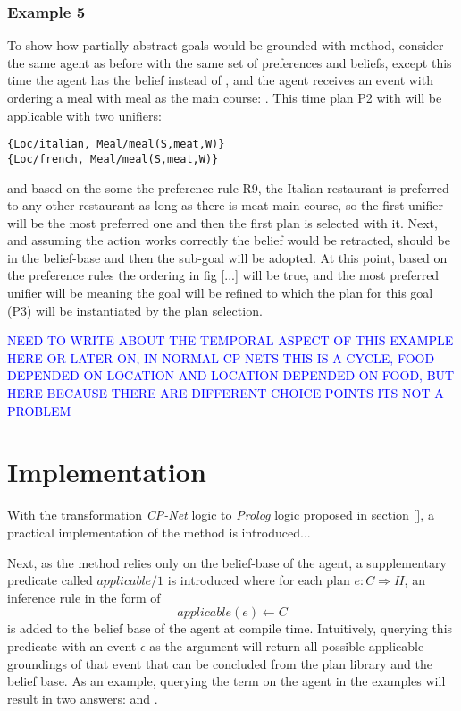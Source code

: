 \documentclass[sigconf,anonymous]{aamas}
\newcommand{\Mos}[1]{\textcolor{blue}{#1}}
\begin{document}
\subsubsection{Example 5}
To show how partially abstract goals would be grounded with method, consider the same agent as before with the same set of preferences and beliefs, except this time the agent has the belief  instead of , and the agent receives an event with ordering a meal with meal as the main course: . This time plan P2 with will be applicable with two unifiers:
\begin{verbatim}
{Loc/italian, Meal/meal(S,meat,W)}
{Loc/french, Meal/meal(S,meat,W)}
\end{verbatim}
and based on the some the preference rule R9, the Italian restaurant is preferred to any other restaurant as long as there is meat main course, so the first unifier will be the most preferred one and then the first plan is selected with it. Next, and assuming the  action works correctly the belief  would be retracted,  should be in the belief-base and then the sub-goal  will be adopted. At this point, based on the preference rules the ordering in fig [...] will be true, and the most preferred unifier will be  meaning the goal will be refined to  which the plan for this goal (P3) will be instantiated by the plan selection.

\Mos{NEED TO WRITE ABOUT THE TEMPORAL ASPECT OF THIS EXAMPLE HERE OR LATER ON, IN NORMAL CP-NETS THIS IS A CYCLE, FOOD DEPENDED ON LOCATION AND LOCATION DEPENDED ON FOOD, BUT HERE BECAUSE THERE ARE DIFFERENT CHOICE POINTS ITS NOT A PROBLEM}

\section{Implementation}
With the transformation \textit{CP-Net} logic to \textit{Prolog} logic proposed in section [], a practical implementation of the method is introduced...



Next, as the method relies only on the belief-base of the agent, a supplementary predicate called $applicable/1$ is introduced where for each plan $e : C \Rightarrow H$, an inference rule in the form of 
\begin{equation}
applicable(e) \leftarrow C
\end{equation}
is added to the belief base of the agent at compile time. Intuitively, querying this predicate with an event $\epsilon$ as the argument will return all possible applicable groundings of that event that can be concluded from the plan library and the belief base. As an example, querying the term  on the agent in the examples will result in two answers:  and .
\end{document}
